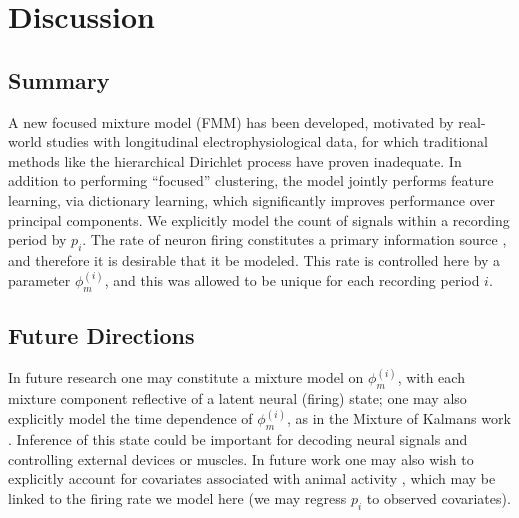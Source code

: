 \documentclass[journal]{IEEEtran}
\begin{document}
\section{Discussion}\label{sec:conclusions}

\subsection{Summary} %
\label{sub:summary}

A new focused mixture model (FMM) has been developed, motivated by real-world studies with longitudinal electrophysiological data, for which traditional methods like the hierarchical Dirichlet process have proven inadequate. In addition to performing ``focused'' clustering, the model jointly performs feature learning, via dictionary learning, which significantly improves performance over principal components. We explicitly model the count of signals within a recording period {by $p_i$}. The rate of neuron firing constitutes a primary information source \cite{Donoghue07}, and therefore it is desirable that it be modeled. This rate is controlled here by a parameter {$\phi_m^{(i)}$}, and this was allowed to be unique for each recording period $i$. 


\subsection{Future Directions} %
\label{sub:future_directions}

In future research one may constitute a mixture model on {$\phi_m^{(i)}$}, with each mixture component reflective of a latent neural (firing) state; one may also explicitly model the time dependence of {$\phi_m^{(i)}$}{, as in the Mixture of Kalmans work} \cite{Calabrese2010}. Inference of this state could be important for decoding neural signals and controlling external devices or muscles. In future work one may also wish to explicitly account for covariates associated with animal activity \cite{Ventura}, which may be linked to the firing rate we model here (we may regress $p_i$ to observed covariates).
\end{document}
